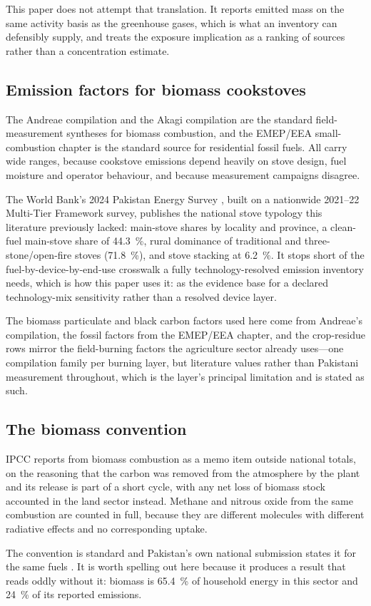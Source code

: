 This paper does not attempt that translation. It reports emitted mass on the same activity
basis as the greenhouse gases, which is what an inventory can defensibly supply, and treats
the exposure implication as a ranking of sources rather than a concentration estimate.

\subsection{Emission factors for biomass cookstoves}

The Andreae compilation \citep{andreae2019} and the Akagi compilation \citep{akagi2011}
are the standard field-measurement syntheses for biomass combustion, and the EMEP/EEA
small-combustion chapter \citep{emep2023smallcombustion} is the standard source for
residential fossil fuels. All carry wide ranges, because cookstove emissions depend heavily
on stove design, fuel moisture and operator behaviour, and because measurement campaigns
disagree.

The World Bank's 2024 Pakistan Energy Survey \citep{worldbank2024mtf}, built on a
nationwide 2021--22 Multi-Tier Framework survey, publishes the national stove typology
this literature previously lacked: main-stove shares by locality and province, a
clean-fuel main-stove share of \SI{44.3}{\percent}, rural dominance of traditional and
three-stone/open-fire stoves (\SI{71.8}{\percent}), and stove stacking at
\SI{6.2}{\percent}. It stops short of the fuel-by-device-by-end-use crosswalk a fully
technology-resolved emission inventory needs, which is how this paper uses it: as the
evidence base for a declared technology-mix sensitivity rather than a resolved device
layer.

The biomass particulate and black carbon factors used here come from Andreae's compilation,
the fossil factors from the EMEP/EEA chapter, and the crop-residue rows mirror the
field-burning factors \citep{emep2019} the agriculture sector already uses---one
compilation family per burning layer, but literature values rather than Pakistani
measurement throughout, which is the layer's principal limitation and is stated as such.

\subsection{The biomass \texorpdfstring{\COtwo{}}{CO2} convention}

IPCC reports \COtwo{} from biomass combustion as a memo item outside national totals, on the
reasoning that the carbon was removed from the atmosphere by the plant and its release is part
of a short cycle, with any net loss of biomass stock accounted in the land sector instead.
Methane and nitrous oxide from the same combustion are counted in full, because they are
different molecules with different radiative effects and no corresponding uptake.

The convention is standard and Pakistan's own national submission states it for the same fuels
\citep{pakbur1}. It is worth spelling out here because it produces a result that reads oddly
without it: biomass is \SI{65.4}{\percent} of household energy in this sector and
\SI{24}{\percent} of its reported emissions.
